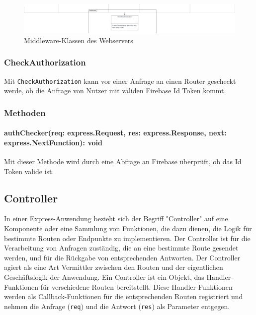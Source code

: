 \documentclass{entwurfsheft}
\begin{document}
\begin{figure}[htp]
    \centering
    \includegraphics[width = 1\textwidth]{images/webserver/middleware.pdf}
    \caption{Middleware-Klassen des Webservers}
    \label{fig:middleware}
\end{figure}

\subsubsection{CheckAuthorization}\label{sec:CheckAuthorization}
Mit \texttt{CheckAuthorization} kann vor einer Anfrage an einen Router gescheckt werde, ob die Anfrage von Nutzer mit validen Firebase Id Token kommt. %
\subsubsection*{Methoden}
\paragraph{authChecker(req: express.Request, res: express.Response, next: express.NextFunction): void}
Mit dieser Methode wird durch eine Abfrage an Firebase überprüft, ob das Id Token valide ist.

\newpage

\subsection{Controller}
In einer Express-Anwendung bezieht sich der Begriff "Controller" auf eine Komponente oder eine Sammlung von Funktionen, die dazu dienen, die Logik für bestimmte Routen oder Endpunkte zu implementieren.
Der Controller ist für die Verarbeitung von Anfragen zuständig, die an eine bestimmte Route gesendet werden, und für die Rückgabe von entsprechenden Antworten.
Der Controller agiert als eine Art Vermittler zwischen den Routen und der eigentlichen Geschäftslogik der Anwendung.
Ein Controller ist ein Objekt, das Handler-Funktionen für verschiedene Routen bereitstellt.
Diese Handler-Funktionen werden als Callback-Funktionen für die entsprechenden Routen registriert und nehmen die Anfrage (\texttt{req}) und die Antwort (\texttt{res}) als Parameter entgegen.
\end{document}
